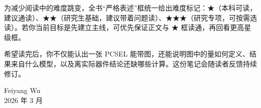 为减少阅读中的难度跳变，全书“严格表述”框统一给出难度标记：★（本科可读，建议通读）、★★（研究生基础，建议带着问题读）、★★★（研究专项，可按需选读）。若你当前目标是先建立主线，可优先保证正文与 ★ 框读通，再回看更高星级框。

希望读完后，你不仅能认出一张 PCSEL 能带图，还能说明图中的量如何定义、结果来自什么模型，以及离实际器件结论还缺哪些计算。这份笔记会随读者反馈持续修订。

\begin{flushright}
Feiyang Wu\\
2026 年 3 月
\end{flushright}

